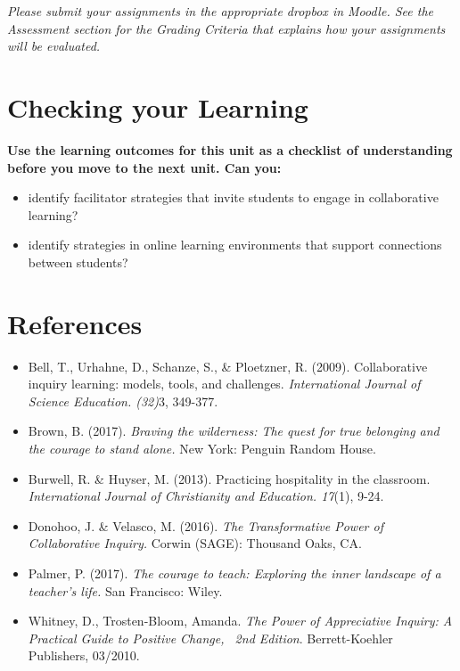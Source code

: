 \documentclass[
]{book}
\providecommand{\tightlist}{%
  \setlength{\itemsep}{0pt}\setlength{\parskip}{0pt}}
\begin{document}
\begin{caution}
\emph{Please submit your assignments in the appropriate dropbox in Moodle. See the Assessment section for the Grading Criteria that explains how your assignments will be evaluated.}
\end{caution}

\hypertarget{checking-your-learning-4}{%
\section*{Checking your Learning}\label{checking-your-learning-4}}

\begin{progress}
\textbf{Use the learning outcomes for this unit as a checklist of understanding before you move to the next unit. Can you:}

\begin{itemize}
\tightlist
\item
  identify facilitator strategies that invite students to engage in collaborative learning?\\
\item
  identify strategies in online learning environments that support connections between students?
\end{itemize}
\end{progress}

\hypertarget{references-2}{%
\section*{References}\label{references-2}}

\begin{itemize}
\tightlist
\item
  Bell, T., Urhahne, D., Schanze, S., \& Ploetzner, R. (2009). Collaborative inquiry learning: models, tools, and challenges. \emph{International Journal of Science Education. (32)}3, 349-377.\\
\item
  Brown, B. (2017). \emph{Braving the wilderness: The quest for true belonging and the courage to stand alone.} New York: Penguin Random House.\\
\item
  Burwell, R. \& Huyser, M. (2013). Practicing hospitality in the classroom. \emph{International Journal of Christianity and Education. 17}(1), 9-24.\\
\item
  Donohoo, J. \& Velasco, M. (2016). \emph{The Transformative Power of Collaborative Inquiry.} Corwin (SAGE): Thousand Oaks, CA.\\
\item
  Palmer, P. (2017). \emph{The courage to teach: Exploring the inner landscape of a teacher's life.} San Francisco: Wiley.\\
\item
  Whitney, D., Trosten-Bloom, Amanda. \emph{The Power of Appreciative Inquiry: A Practical Guide to Positive Change,~ 2nd Edition}. Berrett-Koehler Publishers, 03/2010.
\end{itemize}
\end{document}
